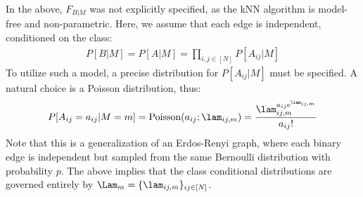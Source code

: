 \documentclass{article}
\begin{document}
In the above, $F_{B|M}$ was not explicitly specified, as the kNN algorithm is model-free and non-parametric.  Here, we assume that each edge is independent, conditioned on the class:
\begin{align}
	P[B|M]=P[A|M]=\prod_{i,j \in [N]} P[A_{ij} | M]
\end{align}
To utilize such a model, a precise distribution for $P[A_{ij}|M]$ must be specified.  A natural choice is a Poisson distribution, thus:
\begin{align}
	P[A_{ij}=a_{ij} |M=m]=\text{Poisson}(a_{ij}; \lam_{ij,m}) = \frac{\lam_{ij,m}^{a_{ij} \text{e}^{\lam_{ij,m}}}}{a_{ij}!}
\end{align}
Note that this is a generalization of an Erdos-Renyi graph, where each binary edge is independent but sampled from the same Bernoulli distribution with probability $p$.  The above implies that the class conditional distributions are governed entirely by $\Lam_m=\{\lam_{ij,m}\}_{ij \in [N]}$.  
\end{document}
